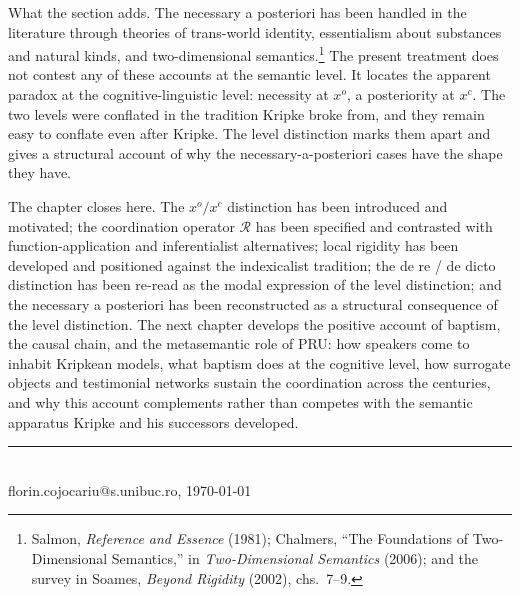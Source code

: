 \documentclass[10pt]{article}
\begin{document}
What the section adds. The necessary a posteriori has been handled in the literature through theories of trans-world identity, essentialism about substances and natural kinds, and two-dimensional semantics.\footnote{Salmon, \emph{Reference and Essence} (1981); Chalmers, ``The Foundations of Two-Dimensional Semantics,'' in \emph{Two-Dimensional Semantics} (2006); and the survey in Soames, \emph{Beyond Rigidity} (2002), chs.~7--9.} The present treatment does not contest any of these accounts at the semantic level. It locates the apparent paradox at the cognitive-linguistic level: necessity at \(x^o\), a posteriority at \(x^c\). The two levels were conflated in the tradition Kripke broke from, and they remain easy to conflate even after Kripke. The level distinction marks them apart and gives a structural account of why the necessary-a-posteriori cases have the shape they have.

The chapter closes here. The \(x^o/x^c\) distinction has been introduced and motivated; the coordination operator \(\mathcal{R}\) has been specified and contrasted with function-application and inferentialist alternatives; local rigidity has been developed and positioned against the indexicalist tradition; the de re / de dicto distinction has been re-read as the modal expression of the level distinction; and the necessary a posteriori has been reconstructed as a structural consequence of the level distinction. The next chapter develops the positive account of baptism, the causal chain, and the metasemantic role of PRU: how speakers come to inhabit Kripkean models, what baptism does at the cognitive level, how surrogate objects and testimonial networks sustain the coordination across the centuries, and why this account complements rather than competes with the semantic apparatus Kripke and his successors developed.

\vfill
\noindent\rule{\textwidth}{0.35pt}\\[1pt]
{\tiny florin.cojocariu@s.unibuc.ro, \today}
\end{document}
